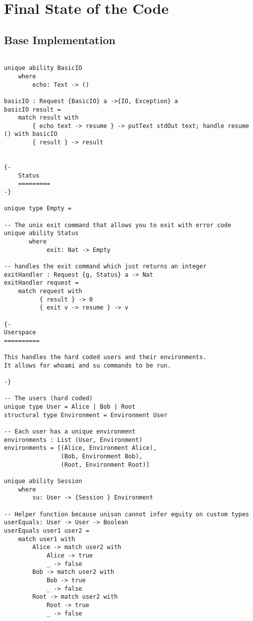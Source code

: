 \documentclass[logo,bsc,singlespacing,parskip]{infthesis}
\begin{document}
\appendix

\chapter{Final State of the Code}

\section{Base Implementation}

\begin{lstlisting}[language=unison]

unique ability BasicIO
    where
        echo: Text -> ()

basicIO : Request {BasicIO} a ->{IO, Exception} a
basicIO result =
    match result with
        { echo text -> resume } -> putText stdOut text; handle resume () with basicIO
        { result } -> result


{-
    Status
    =========
-}

unique type Empty = 

-- The unix exit command that allows you to exit with error code
unique ability Status
       where
            exit: Nat -> Empty

-- handles the exit command which just returns an integer
exitHandler : Request {g, Status} a -> Nat
exitHandler request =
    match request with
          { result } -> 0
          { exit v -> resume } -> v

{-
Userspace
==========

This handles the hard coded users and their environments.
It allows for whoami and su commands to be run.

-}

-- The users (hard coded)
unique type User = Alice | Bob | Root
structural type Environment = Environment User

-- Each user has a unique environment
environments : List (User, Environment)
environments = [(Alice, Environment Alice),
                (Bob, Environment Bob),
                (Root, Environment Root)]

unique ability Session
    where
        su: User -> {Session } Environment

-- Helper function because unison cannot infer equity on custom types
userEquals: User -> User -> Boolean
userEquals user1 user2 =
    match user1 with
        Alice -> match user2 with
            Alice -> true
            _ -> false
        Bob -> match user2 with
            Bob -> true
            _ -> false
        Root -> match user2 with
            Root -> true
            _ -> false


\end{lstlisting}
\end{document}

